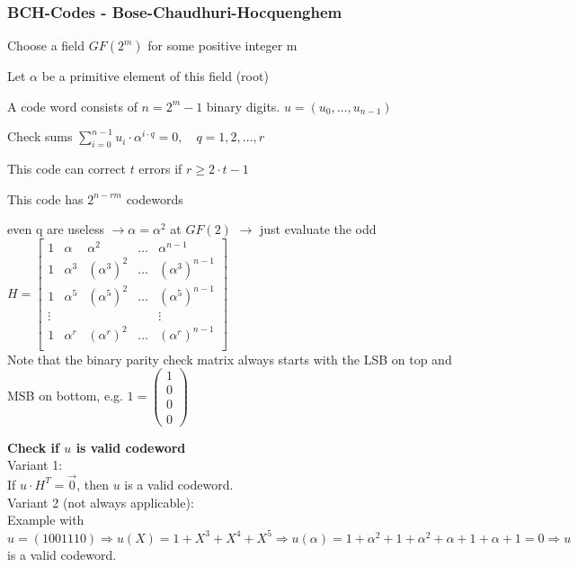 \subsubsection{BCH-Codes - Bose-Chaudhuri-Hocquenghem}
\begin{liste}
  \item Choose a field $GF(2^m)$ for some positive integer m
  \item Let $\alpha$ be a primitive element of this field (root)
  \item A code word consists of $n=2^m-1$ binary digits. $u=(u_0, \ldots, u_{n-1})$
  \item Check sums $\displaystyle\sum_{i=0}^{n-1} u_i \cdot \alpha^{i \cdot q} = 0, \quad q=1,2,\ldots,r$
  \item This code can correct $t$ errors if $r \geq 2\cdot t-1$
  \item This code has $2^{n-rm}$ codewords
  \item even q are useless $\to \alpha=\alpha^2$ at $GF(2)$ $\to$ just evaluate the odd\\
     			$H=\begin{bmatrix} 	1 & \alpha   & \alpha^2     	& \ldots	& \alpha^{n-1} \\    		
   						   		1 & \alpha^3 & (\alpha^3)^2	& \ldots	& (\alpha^3)^{n-1}  \\    
   						   		1 & \alpha^5 & (\alpha^5)^2	& \ldots	& (\alpha^5)^{n-1}  \\   
   						   		\vdots	&	 &					&			& \vdots \\   						 
   						   		1 & \alpha^r & (\alpha^r)^2	& \ldots	& (\alpha^r)^{n-1}  \\   		
   			\end{bmatrix}$\\
			Note that the binary parity check matrix always starts with the LSB on top and MSB on bottom, e.g. $1=\begin{pmatrix} 1 \\ 0 \\ 0 \\ 0 \end{pmatrix}$ \\
\end{liste}

\textbf{Check if $u$ is valid codeword} \\
Variant 1:\\
If $u \cdot H^T = \vec{0}$, then $u$ is a valid codeword.\\

Variant 2 (not always applicable):\\
Example with $u=( 1 0 0 1 1 1 0 )\Rightarrow u(X)=1+X^3+X^4+X^5 \Rightarrow u(\alpha)=1+\alpha^2+1+\alpha^2+\alpha+1+\alpha+1=0 \Rightarrow u$ is a valid codeword. 

